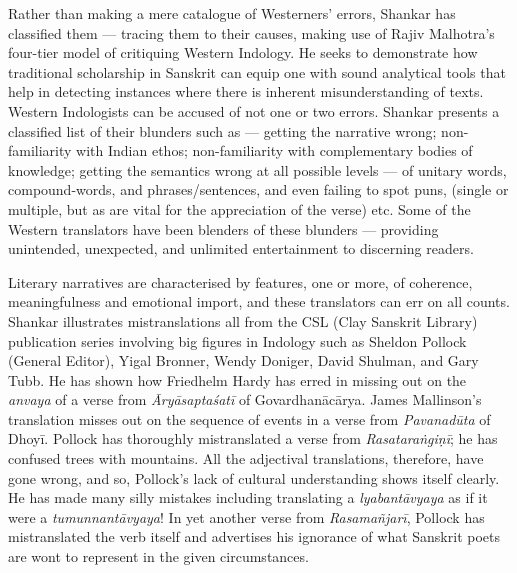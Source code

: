 Rather than making a mere catalogue of Westerners’ errors, Shankar has classified them --- tracing them to their causes, making use of Rajiv Malhotra’s four-tier model of critiquing Western Indology. He seeks to demonstrate how traditional scholarship in Sanskrit can equip one with sound analytical tools that help in detecting instances where there is inherent misunderstanding of texts. Western Indologists can be accused of not one or two errors. Shankar presents a classified list of their blunders such as --- getting the narrative wrong; non-familiarity with Indian ethos; non-familiarity with complementary bodies of knowledge; getting the semantics wrong at all possible levels --- of unitary words, compound-words, and phrases/sentences, and even failing to spot puns, (single or multiple, but as are vital for the appreciation of the verse) etc. Some of the Western translators have been blenders of these blunders --- providing unintended, unexpected, and unlimited entertainment to discerning readers. 

Literary narratives are characterised by features, one or more, of coherence, meaningfulness and emotional import, and these translators can err on all counts. Shankar illustrates mistranslations all from the CSL (Clay Sanskrit Library) publication series involving big figures in Indology such as Sheldon Pollock (General Editor), Yigal Bronner, Wendy Doniger, David Shulman, and Gary Tubb. He has shown how Friedhelm Hardy has erred in missing out on the \textsl{anvaya} of a verse from \textsl{Āryāsaptaśatī} of Govardhanācārya. James Mallinson’s translation misses out on the sequence of events in a verse from \textsl{Pavanadūta} of Dhoyī. Pollock has thoroughly mistranslated a verse from \textsl{Rasataraṅgiṇī}; he has confused trees with mountains. All the adjectival translations, therefore, have gone wrong, and so, Pollock’s lack of cultural understanding shows itself clearly. He has made many silly mistakes including translating a \textsl{lyabantāvyaya} as if it were a \textsl{tumunnantāvyaya}! In yet another verse from \textsl{Rasamañjarī}, Pollock has mistranslated the verb itself and advertises his ignorance of what Sanskrit poets are wont to represent in the given circumstances.

